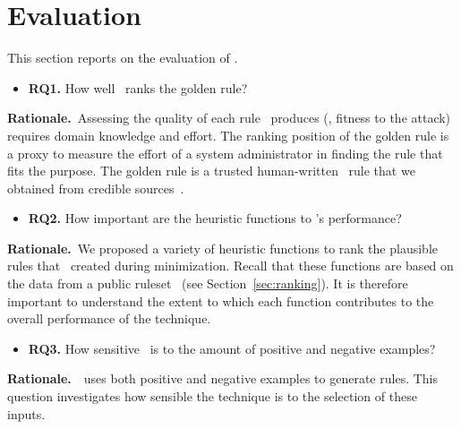 \documentclass[conference]{IEEEtran}
\begin{document}
\section{Evaluation}

This section reports on the evaluation of \tname{}.

\newcommand{\textRQone}{How well \tname\ ranks the golden rule?}
\begin{itemize}[leftmargin=*,label={}]
\item{\textbf{RQ1.}} \textRQone
\end{itemize}

\noindent
\textbf{Rationale.}~Assessing the quality of each rule
\tname\ produces (\ie{}, fitness to the attack) requires domain
knowledge and effort. The ranking position of the golden rule is a
proxy to measure the effort of a system administrator in finding the
rule that fits the purpose.  The golden rule is a trusted
human-written \nids\ rule that we obtained from credible
sources~\cite{emerging-threats-open}.



\newcommand{\textRQtwo}{How important are the heuristic functions
  to \tname's performance?}

\begin{itemize}[leftmargin=*,label={}]
\item{\textbf{RQ2.}} \textRQtwo\
\end{itemize}

\noindent
\textbf{Rationale.}~We proposed a variety of heuristic functions to
rank the plausible rules that \tname\ created during
minimization. Recall that these functions are based on the data from a
public ruleset~\cite{emerging-threats-open} (see
Section~\ref{sec:ranking}). It is therefore important to understand
the extent to which each function contributes to the overall
performance of the technique.

\newcommand{\textRQthree}{How sensitive \tname\ is to the amount of
  positive and negative examples?}

\begin{itemize}[leftmargin=*,label={}]
\item{\textbf{RQ3.}} \textRQthree\
\end{itemize}

\noindent
\textbf{Rationale.}~\tname\ uses both positive and negative examples
to generate rules. This question investigates how sensible the
technique is to the selection of these inputs.
\noindent
\vspace{1ex}
\end{document}
